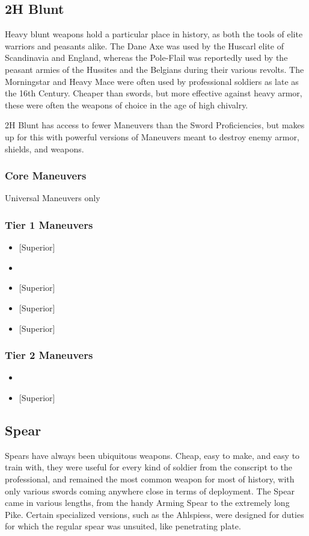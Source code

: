 \documentclass[oneside,11pt,english]{book}
\begin{document}
\subsection{2H Blunt}
Heavy blunt weapons hold a particular place in history, as both the tools of elite warriors and 
peasants alike. The Dane Axe was used by the Huscarl elite of Scandinavia and England, whereas the 
Pole-Flail was reportedly used by the peasant armies of the Hussites and the Belgians during their various 
revolts. The Morningstar and Heavy Mace were often used by professional soldiers as late as the 16th 
Century. Cheaper than swords, but more effective against heavy armor, these were often the weapons of choice in the age of high chivalry.

2H Blunt has access to fewer Maneuvers than the Sword Proficiencies, but makes up for this with 
powerful versions of Maneuvers meant to destroy enemy armor, shields, and weapons. 

\subsubsection{Core Maneuvers}
Universal Maneuvers only

\subsubsection{Tier 1 Maneuvers}
\vspace{-5pt}\begin{itemize}
  [itemsep=0.5mm]
\item {} [Superior]
\item {}
\item {} [Superior]
\item {} [Superior]
\item {} [Superior]
\end{itemize}

\subsubsection{Tier 2 Maneuvers}
\vspace{-5pt}\begin{itemize}
  [itemsep=0.5mm]
\item {}
\item {} [Superior]
\end{itemize}
\subsection{Spear}
Spears have always been ubiquitous weapons. Cheap, easy to make, and easy to train with, they 
were useful for every kind of soldier from the conscript to the professional, and remained the most 
common weapon for most of history, with only various swords coming anywhere close in terms of 
deployment. The Spear came in various lengths, from the handy Arming Spear to the extremely long Pike. 
Certain specialized versions, such as the Ahlspiess, were designed for duties for which the regular spear 
was unsuited, like penetrating plate. 
\end{document}

